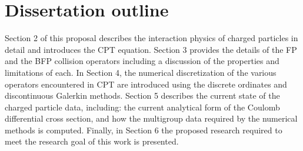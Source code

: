 \documentclass[../main.tex]{subfiles}
\begin{document}
\section{Dissertation outline}
Section 2 of this proposal describes the interaction physics of charged particles in detail and introduces the CPT equation. Section 3 provides the details of the FP and the BFP collision operators including a discussion of the properties and limitations of each. In Section 4, the numerical discretization of the various operators encountered in CPT are introduced using the discrete ordinates and discontinuous Galerkin methods. Section 5 describes the current state of the charged particle data, including: the current analytical form of the Coulomb differential cross section, and how the multigroup data required by the numerical methods is computed. Finally, in Section 6 the proposed research required to meet the research goal of this work is presented. 
\end{document}
